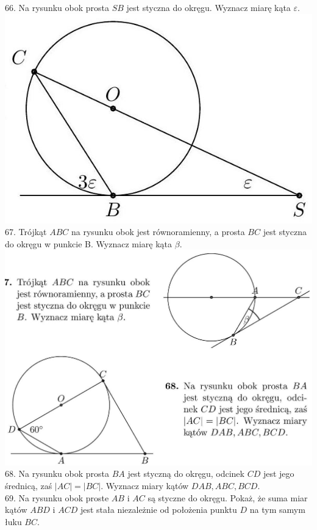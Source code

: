 \documentclass[10pt]{article}
\begin{document}
66. Na rysunku obok prosta \(S B\) jest styczna do okręgu. Wyznacz miarę kąta \(\varepsilon\).\\
\includegraphics[max width=\textwidth, center]{2024_11_21_e9b4faa005d5be2cc318g-045}\\
67. Trójkąt \(A B C\) na rysunku obok jest równoramienny, a prosta \(B C\) jest styczna do okręgu w punkcie B. Wyznacz miarę kąta \(\beta\).\\
\includegraphics[max width=\textwidth, center]{2024_11_21_e9b4faa005d5be2cc318g-045(2)}\\
68. Na rysunku obok prosta \(B A\) jest styczną do okręgu, odcinek \(C D\) jest jego średnicą, zaś \(|A C|=|B C|\). Wyznacz miary kątów \(D A B, A B C, B C D\).\\
69. Na rysunku obok proste \(A B\) i \(A C\) są styczne do okręgu. Pokaż, że suma miar kątów \(A B D\) i \(A C D\) jest stała niezależnie od położenia punktu \(D\) na tym samym łuku \(B C\).\\
\end{document}
